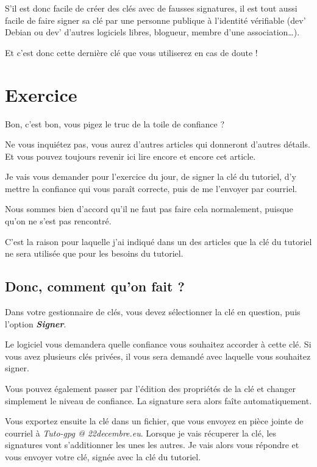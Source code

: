 S'il est donc facile de créer des clés avec de fausses signatures, il
est tout aussi facile de faire signer sa clé par une personne publique à
l'identité vérifiable (dev' Debian ou dev' d'autres logiciels libres,
blogueur, membre d'une association\ldots{}).

Et c'est donc cette dernière clé que vous utiliserez en cas de doute !

\section{Exercice}\label{exercice}

Bon, c'est bon, vous pigez le truc de la toile de confiance ?

Ne vous inquiétez pas, vous aurez d'autres articles qui donneront
d'autres détails. Et vous pouvez toujours revenir ici lire encore et
encore cet article.

Je vais vous demander pour l'exercice du jour, de signer la clé du
tutoriel, d'y mettre la confiance qui vous paraît correcte, puis de me
l'envoyer par courriel.

Nous sommes bien d'accord qu'il ne faut pas faire cela normalement,
puisque qu'on ne s'est pas rencontré.

C'est la raison pour laquelle j'ai indiqué dans un des articles que la
clé du tutoriel ne sera utilisée que pour les besoins du tutoriel.

\subsection{Donc, comment qu'on fait ?}\label{donc-comment-quon-fait}

Dans votre gestionnaire de clés, vous devez sélectionner la clé en
question, puis l'option \textbf{\emph{Signer}}.

Le logiciel vous demandera quelle confiance vous souhaitez accorder à
cette clé. Si vous avez plusieurs clés privées, il vous sera demandé
avec laquelle vous souhaitez signer.

Vous pouvez également passer par l'édition des propriétés de la clé et
changer simplement le niveau de confiance. La signature sera alors faîte
automatiquement.

Vous exportez ensuite la clé dans un fichier, que vous envoyez en pièce
jointe de courriel à \emph{Tuto-gpg @ 22decembre.eu}. Lorsque je vais
récuperer la clé, les signatures vont s'additionner les unes les autres.
Je vais alors vous répondre et vous envoyer votre clé, signée avec la
clé du tutoriel.

